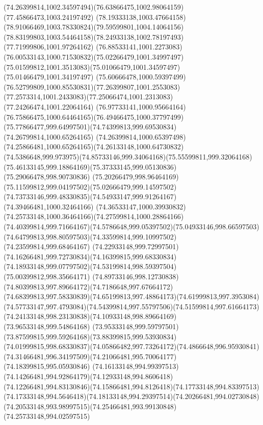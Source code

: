 {{  \curveto(74.26399814,1002.34597494)(76.63866475,1002.98064159)(77.45866473,1003.24197492)
  \curveto(78.19333138,1003.47664158)(78.91066469,1003.78330824)(79.59599801,1004.14064156)
  \curveto(78.83199803,1003.54464158)(78.24933138,1002.78197493)(77.71999806,1001.97264162)
  \curveto(76.88533141,1001.2273083)(76.00533143,1000.71530832)(75.02266479,1001.34997497)
  \curveto(75.01599812,1001.3513083)(75.01066479,1001.34597497)(75.01466479,1001.34197497)
  \curveto(75.60666478,1000.59397499)(76.52799809,1000.85530831)(77.26399807,1001.2553083)
  \curveto(77.2573314,1001.2433083)(77.25066474,1001.2313083)(77.24266474,1001.22064164)
  \curveto(76.97733141,1000.95664164)(76.75866475,1000.64464165)(76.49466475,1000.37797499)
  \curveto(75.77866477,999.64997501)(74.74399813,999.69530834)(74.26799814,1000.65264165)
  \curveto(74.26399814,1000.65397498)(74.25866481,1000.65264165)(74.26133148,1000.64730832)
  \curveto(74.5386648,999.973975)(74.85733146,999.34064168)(75.55599811,999.32064168)
  \curveto(75.46133145,999.18864169)(75.37333145,999.05130836)(75.29066478,998.90730836)
  \curveto(75.20266479,998.96464169)(75.11599812,999.04197502)(75.02666479,999.14597502)
  \curveto(74.73733146,999.48330835)(74.54933147,999.91264167)(74.39466481,1000.32464166)
  \curveto(74.36533147,1000.39930832)(74.25733148,1000.36464166)(74.27599814,1000.28864166)
  \curveto(74.40399814,999.71664167)(74.5786648,999.05397502)(75.04933146,998.66597503)
  \curveto(74.64799813,998.80597503)(74.33599814,999.10997502)(74.23599814,999.68464167)
  \curveto(74.22933148,999.72997501)(74.16266481,999.72730834)(74.16399815,999.68330834)
  \curveto(74.18933148,999.07797502)(74.53199814,998.59397504)(75.00399812,998.35664171)
  \curveto(74.89733146,998.12730838)(74.80399813,997.89664172)(74.7186648,997.67664172)
  \curveto(74.68399813,997.58330839)(74.65199813,997.48864173)(74.61999813,997.3953084)
  \curveto(74.57733147,997.4793084)(74.54399814,997.55797506)(74.51599814,997.61664173)
  \curveto(74.24133148,998.23130838)(74.10933148,998.89664169)(73.96533148,999.54864168)
  \curveto(73.95333148,999.59797501)(73.87599815,999.59264168)(73.88399815,999.53930834)
  \curveto(74.01999815,998.68330837)(74.05866482,997.73264172)(74.4866648,996.95930841)
  \curveto(74.31466481,996.34197509)(74.21066481,995.70064177)(74.18399815,995.05930846)
  \curveto(74.16133148,994.99397513)(74.14266481,994.92864179)(74.12933148,994.8606418)
  \curveto(74.12266481,994.83130846)(74.15866481,994.8126418)(74.17733148,994.83397513)
  \curveto(74.17333148,994.5646418)(74.18133148,994.29397514)(74.20266481,994.02730848)
  \curveto(74.20533148,993.98997515)(74.25466481,993.99130848)(74.25733148,994.02597515)
}}
